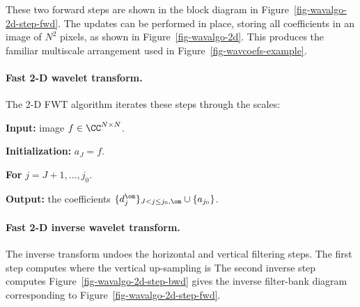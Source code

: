 
These two forward steps are shown in the block diagram in Figure~\ref{fig-wavalgo-2d-step-fwd}.
The updates can be performed in place, storing all coefficients in an image of $N^2$ pixels, as shown in Figure~\ref{fig-wavalgo-2d}. This produces the familiar multiscale arrangement used in Figure~\ref{fig-wavcoefs-example}.

\paragraph{Fast 2-D wavelet transform.}

The 2-D FWT algorithm iterates these steps through the scales:
\begin{rs}
	\item \textbf{Input:} image $f \in \CC^{N\times N}$.
	\item \textbf{Initialization:} $a_J = f$.
	\item \textbf{For} $j=J+1,\ldots,j_0$.
	\item \textbf{Output:} the coefficients $\{d_j^\om\}_{J<j\leq j_0,\om} \cup \{ a_{j_0} \}$.
\end{rs}


\paragraph{Fast 2-D inverse wavelet transform.}

The inverse transform undoes the horizontal and vertical filtering steps.
The first step computes
where the vertical up-sampling is
The second inverse step computes
Figure~\ref{fig-wavalgo-2d-step-bwd} gives the inverse filter-bank diagram corresponding to Figure~\ref{fig-wavalgo-2d-step-fwd}.

